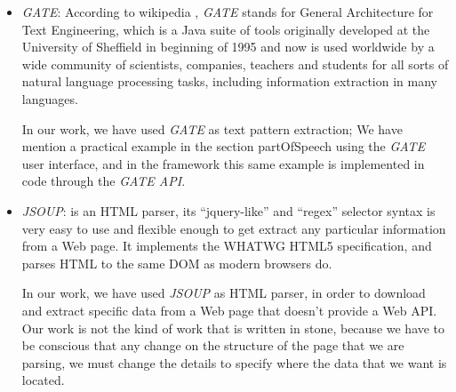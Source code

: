 \begin{itemize}
	\item \emph{GATE}\label{gate}: According to wikipedia \cite{G2014}, \emph{GATE} stands for General Architecture for Text Engineering, which is a Java suite of tools originally developed at the University of Sheffield in beginning of 1995 and now is used worldwide by a wide community of scientists, companies, teachers and students for all sorts of natural language processing tasks, including information extraction in many languages. 
	
	In our work, we have used \emph{GATE} as text pattern extraction; We have mention a practical example in the section {partOfSpeech} using the \emph{GATE} user interface, and in the framework this same example is implemented in code through the \emph{GATE API}.
	
	\item \emph{JSOUP}: is an HTML parser, its “jquery-like” and “regex” selector syntax is very easy to use and flexible enough to get extract any particular information from a Web page. It implements the WHATWG HTML5 specification, and parses HTML to the same DOM as modern browsers do.
	
	In our work, we have used \emph{JSOUP} as HTML parser, in order to download and extract specific data from a Web page that doesn't provide a Web API. Our work is not the kind of work that is written in stone, because we have to be conscious that any change on the structure of the page that we are parsing, we must change the details to specify where the data that we want is located.
	 
\end{itemize}

